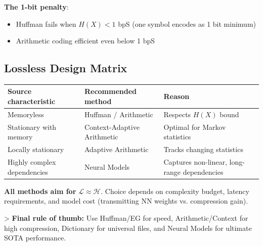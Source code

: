 \textbf{The 1-bit penalty}:
\begin{itemize}
\item Huffman fails when $H(X) < 1$ bpS (one symbol encodes as 1 bit minimum)
\item Arithmetic coding efficient even below 1 bpS
\end{itemize}

\subsection{Lossless Design Matrix}

\begin{center}
\begin{tabular}{|l|l|l|}
\hline
\textbf{Source characteristic} & \textbf{Recommended method} & \textbf{Reason} \\ \hline
Memoryless & Huffman / Arithmetic & Respects $H(X)$ bound \\ \hline
Stationary with memory & Context-Adaptive Arithmetic & Optimal for Markov statistics \\ \hline
Locally stationary & Adaptive Arithmetic & Tracks changing statistics \\ \hline
Highly complex dependencies & Neural Models & Captures non-linear, long-range dependencies \\ \hline
\end{tabular}
\end{center}

\textbf{All methods aim for} $\mathcal{L} \approx \mathcal{H}$. Choice depends on complexity budget, latency requirements, and model cost (transmitting NN weights vs. compression gain).

\textgreater{} \textbf{Final rule of thumb:} Use Huffman/EG for speed, Arithmetic/Context for high compression, Dictionary for universal files, and Neural Models for ultimate SOTA performance.

